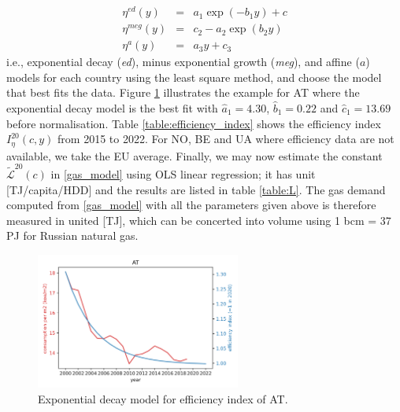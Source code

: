 \documentclass[12pt]{article}
\def\bea{\begin{eqnarray}}
\def\eea{\end{eqnarray}}
\begin{document}
\bea
\eta^{ed}(y) &=& a_1 \exp(-b_1y) + c \\
\eta^{meg}(y) &=& c_2 - a_2 \exp(b_2y) \\
\eta^a(y) &=& a_3 y+c_3
\eea
i.e., exponential decay (\textit{ed}), minus exponential growth (\textit{meg}), and affine ($a$) models for each country using the least square method, and choose the model that best fits the data. Figure \ref{fig:efficiency_index_AT} illustrates the example for AT where the exponential decay model is the best fit with $\hat{a}_1=4.30$, $\hat{b}_1=0.22$ and $\hat{c}_1=13.69$ before normalisation. Table \ref{table:efficiency_index} shows the efficiency index $I_\eta^{20}(c,y)$ from 2015 to 2022. For NO, BE and UA where efficiency data are not available, we take the EU average. Finally, we may now estimate the constant $\tilde{\mathcal{L}}^{20}(c)$ in \eqref{gas_model} using OLS linear regression; it has unit [TJ/capita/HDD] and the results are listed in table \ref{table:L}. The gas demand computed from \ref{gas_model} with all the parameters given above is therefore measured in united [TJ], which can be concerted into volume using 1 bcm = 37 PJ for Russian natural gas.


\begin{figure}[h!]
\centering
	\includegraphics[width=0.6\textwidth]{efficiency_index_AT}
	\caption{Exponential decay model for efficiency index of AT. } \label{fig:efficiency_index_AT}
\end{figure}
\end{document}
